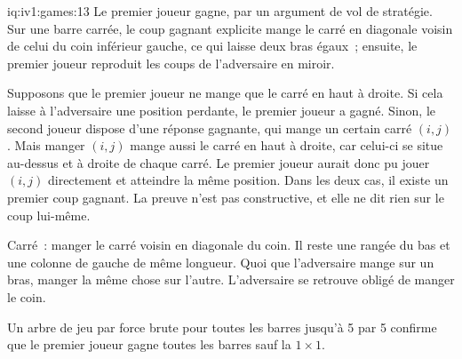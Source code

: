 \begin{solution}{iq:iv1:games:13}
Le premier joueur gagne, par un argument de vol de stratégie. Sur une barre carrée, le coup gagnant explicite mange le carré en diagonale voisin de celui du coin inférieur gauche, ce qui laisse deux bras égaux~; ensuite, le premier joueur reproduit les coups de l'adversaire en miroir.

Supposons que le premier joueur ne mange que le carré en haut à droite. Si cela laisse à l'adversaire une position perdante, le premier joueur a gagné. Sinon, le second joueur dispose d'une réponse gagnante, qui mange un certain carré $(i, j)$. Mais manger $(i, j)$ mange aussi le carré en haut à droite, car celui-ci se situe au-dessus et à droite de chaque carré. Le premier joueur aurait donc pu jouer $(i, j)$ directement et atteindre la même position. Dans les deux cas, il existe un premier coup gagnant. La preuve n'est pas constructive, et elle ne dit rien sur le coup lui-même.

Carré~: manger le carré voisin en diagonale du coin. Il reste une rangée du bas et une colonne de gauche de même longueur. Quoi que l'adversaire mange sur un bras, manger la même chose sur l'autre. L'adversaire se retrouve obligé de manger le coin.

Un arbre de jeu par force brute pour toutes les barres jusqu'à 5 par 5 confirme que le premier joueur gagne toutes les barres sauf la $1 \times 1$.

\end{solution}

